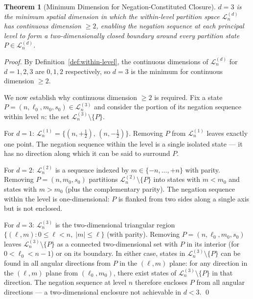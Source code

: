 \documentclass[twocolumn,10pt,a4paper]{article}
\theoremstyle{thmstyle}
\newtheorem{theorem}{Theorem}[section]
\theoremstyle{definition}
\theoremstyle{remark}
\begin{document}
\begin{theorem}[Minimum Dimension for Negation-Constituted Closure]
\label{thm:min-dim}
$d = 3$ is the minimum spatial dimension in which the within-level partition space $\mathcal{L}_n^{(d)}$ has continuous dimension $\geq 2$, enabling the negation sequence at each principal level to form a two-dimensionally closed boundary around every partition state $P \in \mathcal{L}_n^{(d)}$.
\end{theorem}

\begin{proof}
By Definition~\ref{def:within-level}, the continuous dimensions of $\mathcal{L}_n^{(d)}$ for $d = 1, 2, 3$ are $0, 1, 2$ respectively, so $d = 3$ is the minimum for continuous dimension $\geq 2$.

We now establish why continuous dimension $\geq 2$ is required. Fix a state $P = (n, \ell_0, m_0, s_0) \in \mathcal{L}_n^{(3)}$ and consider the portion of its negation sequence within level $n$: the set $\mathcal{L}_n^{(3)} \setminus \{P\}$.

For $d = 1$: $\mathcal{L}_n^{(1)} = \{(n,+\tfrac{1}{2}),\, (n,-\tfrac{1}{2})\}$. Removing $P$ from $\mathcal{L}_n^{(1)}$ leaves exactly one point. The negation sequence within the level is a single isolated state --- it has no direction along which it can be said to surround $P$.

For $d = 2$: $\mathcal{L}_n^{(2)}$ is a sequence indexed by $m \in \{-n,\ldots,+n\}$ with parity. Removing $P = (n, m_0, s_0)$ partitions $\mathcal{L}_n^{(2)} \setminus \{P\}$ into states with $m < m_0$ and states with $m > m_0$ (plus the complementary parity). The negation sequence within the level is one-dimensional: $P$ is flanked from two sides along a single axis but is not enclosed.

For $d = 3$: $\mathcal{L}_n^{(3)}$ is the two-dimensional triangular region $\{(\ell, m) : 0 \leq \ell < n,\; |m| \leq \ell\}$ (with parity). Removing $P = (n, \ell_0, m_0, s_0)$ leaves $\mathcal{L}_n^{(3)} \setminus \{P\}$ as a connected two-dimensional set with $P$ in its interior (for $0 < \ell_0 < n-1$) or on its boundary. In either case, states in $\mathcal{L}_n^{(3)} \setminus \{P\}$ can be found in all angular directions from $P$ in the $(\ell, m)$ plane: for any direction in the $(\ell, m)$ plane from $(\ell_0, m_0)$, there exist states of $\mathcal{L}_n^{(3)} \setminus \{P\}$ in that direction. The negation sequence at level $n$ therefore encloses $P$ from all angular directions --- a two-dimensional enclosure not achievable in $d < 3$. \qed
\end{proof}
\end{document}
